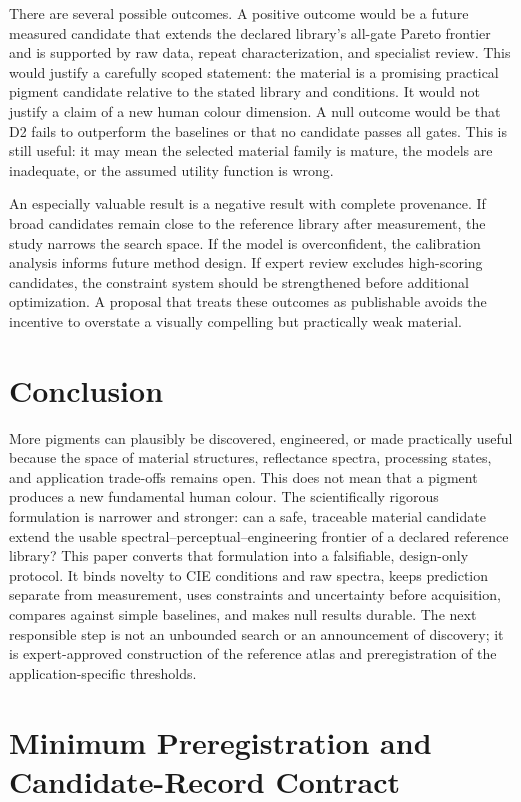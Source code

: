 \documentclass[conference]{IEEEtran}
\begin{document}
There are several possible outcomes. A positive outcome would be a future measured candidate that extends the declared library's all-gate Pareto frontier and is supported by raw data, repeat characterization, and specialist review. This would justify a carefully scoped statement: the material is a promising practical pigment candidate relative to the stated library and conditions. It would not justify a claim of a new human colour dimension. A null outcome would be that D2 fails to outperform the baselines or that no candidate passes all gates. This is still useful: it may mean the selected material family is mature, the models are inadequate, or the assumed utility function is wrong.

An especially valuable result is a negative result with complete provenance. If broad candidates remain close to the reference library after measurement, the study narrows the search space. If the model is overconfident, the calibration analysis informs future method design. If expert review excludes high-scoring candidates, the constraint system should be strengthened before additional optimization. A proposal that treats these outcomes as publishable avoids the incentive to overstate a visually compelling but practically weak material.

\section{Conclusion}

More pigments can plausibly be discovered, engineered, or made practically useful because the space of material structures, reflectance spectra, processing states, and application trade-offs remains open. This does not mean that a pigment produces a new fundamental human colour. The scientifically rigorous formulation is narrower and stronger: can a safe, traceable material candidate extend the usable spectral--perceptual--engineering frontier of a declared reference library? This paper converts that formulation into a falsifiable, design-only protocol. It binds novelty to CIE conditions and raw spectra, keeps prediction separate from measurement, uses constraints and uncertainty before acquisition, compares against simple baselines, and makes null results durable. The next responsible step is not an unbounded search or an announcement of discovery; it is expert-approved construction of the reference atlas and preregistration of the application-specific thresholds.

\section{Minimum Preregistration and Candidate-Record Contract}
\end{document}
